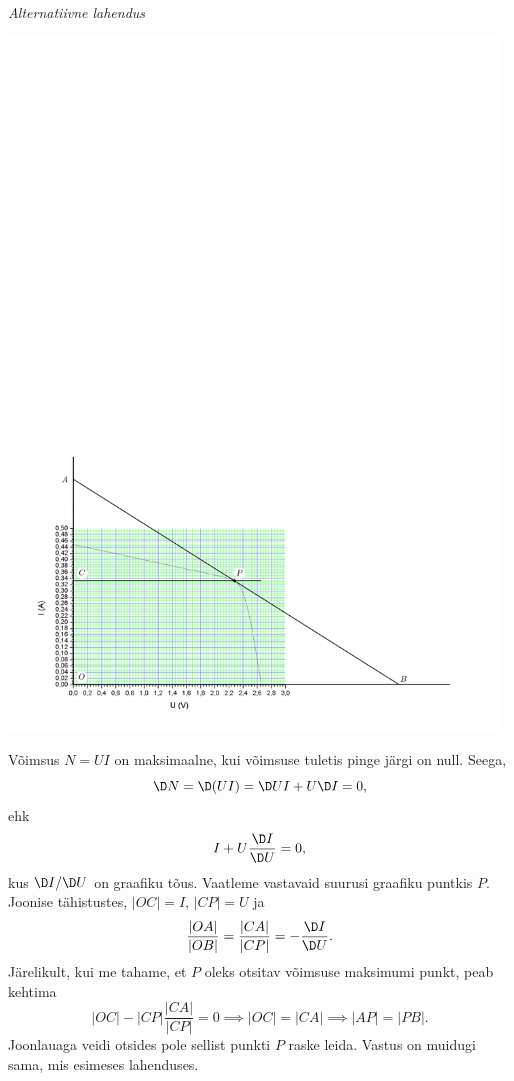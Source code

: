 \documentclass[11pt, twoside]{article}
\begin{document}
{{\textit{Alternatiivne lahendus}\\

\begin{center}
	\hspace{-0.1cm}\includegraphics[width=130mm]{2010-v3g-03-joonis_paneel_lah_2}
\end{center}

Võimsus $N = UI$ on maksimaalne, kui võimsuse tuletis pinge järgi on null. Seega,
\[
\D N = \D (UI) = \D UI + U\D I = 0,
\]
ehk
\[
I + U\frac{\D I}{\D U} = 0,
\]
kus $\D I/\D U$ on graafiku tõus. Vaatleme vastavaid suurusi graafiku puntkis $P$. Joonise tähistustes, $|OC| = I$, $|CP| = U$ ja
\[
\frac{|OA|}{|OB|} =
\frac{|CA|}{|CP|} = -\frac{\D I}{\D U}.
\]
Järelikult, kui me tahame, et
$P$ oleks otsitav võimsuse maksimumi punkt, peab kehtima
\[
|OC| - |CP|
\frac{|CA|}{|CP|} = 0 \implies |OC| = |CA| \implies |AP| = |PB|.
\]
Joonlauaga veidi otsides pole sellist punkti $P$ raske leida. Vastus on muidugi sama, mis esimeses lahenduses.
\fi
}

}
\end{document}
